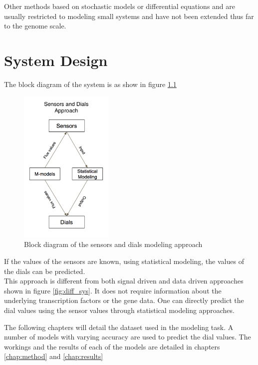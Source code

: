 \documentclass[12pt,chapterheads]{ucsd}
\begin{document}
Other methods based on stochastic models or differential equations \cite{10.1371/journal.pcbi.1000086} and \cite{10.1371/journal.pcbi.1005489} are usually restricted to modeling small systems and have not been extended thus far to the genome scale.


\chapter{System Design}

The block diagram of the system is as show in figure \ref{fig:sys}

\begin{figure}[h] 
\centering
\includegraphics[width=0.4\textwidth]{Figures/my_model}
\caption[Block diagram of the sensors and dials modeling approach]
{Block diagram of the sensors and dials modeling approach}
\label{fig:sys}
\end{figure}

\vspace{0.25in}
If the values of the sensors are known, using statistical modeling, the values of the dials can be predicted.\\
This approach is different from both signal driven and data driven approaches shown in figure \ref{fig:diff_sys}. It does not require information about the underlying transcription factors or the gene data. One can directly predict the dial values using the sensor values through statistical modeling approaches.

The following chapters will detail the dataset used in the modeling task. A number of models with varying accuracy are used to predict the dial values. The workings and the results of each of the models are detailed in chapters \ref{chap:method} and \ref{chap:results}
\end{document}
